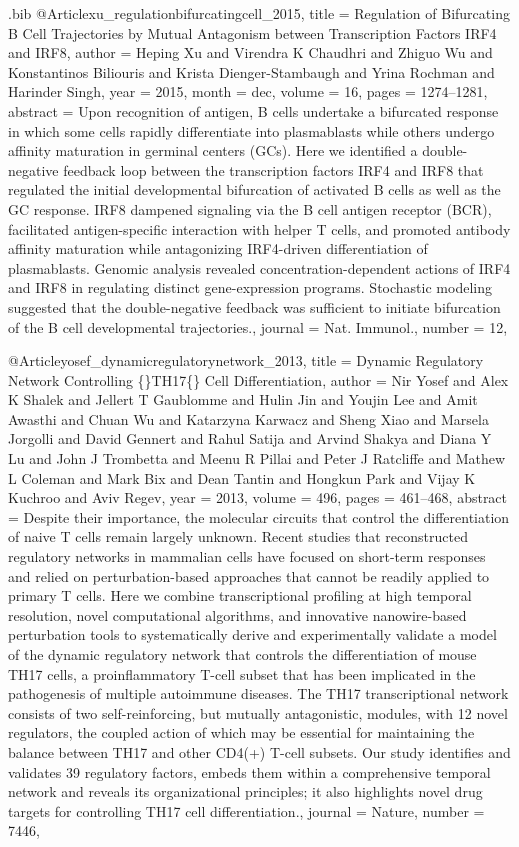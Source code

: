 \documentclass[
  table,
  10pt,
  a4paper]{article}
\begin{document}
\begin{filecontents}{\jobname.bib}
@Article{xu_regulationbifurcatingcell_2015,
	title = {Regulation of Bifurcating {{B}} Cell Trajectories by Mutual Antagonism between Transcription Factors {{IRF4}} and {{IRF8}}},
	author = {Heping Xu and Virendra K Chaudhri and Zhiguo Wu and Konstantinos Biliouris and Krista Dienger-Stambaugh and Yrina Rochman and Harinder Singh},
	year = {2015},
	month = {dec},
	volume = {16},
	pages = {1274--1281},
	abstract = {Upon recognition of antigen, B cells undertake a bifurcated response in which some cells rapidly differentiate into plasmablasts while others undergo affinity maturation in germinal centers (GCs). Here we identified a double-negative feedback loop between the transcription factors IRF4 and IRF8 that regulated the initial developmental bifurcation of activated B cells as well as the GC response. IRF8 dampened signaling via the B cell antigen receptor (BCR), facilitated antigen-specific interaction with helper T cells, and promoted antibody affinity maturation while antagonizing IRF4-driven differentiation of plasmablasts. Genomic analysis revealed concentration-dependent actions of IRF4 and IRF8 in regulating distinct gene-expression programs. Stochastic modeling suggested that the double-negative feedback was sufficient to initiate bifurcation of the B cell developmental trajectories.},
	journal = {Nat. Immunol.},
	number = {12},
}

@Article{yosef_dynamicregulatorynetwork_2013,
	title = {Dynamic Regulatory Network Controlling \{\vphantom\}{{TH17}}\vphantom\{\} Cell Differentiation},
	author = {Nir Yosef and Alex K Shalek and Jellert T Gaublomme and Hulin Jin and Youjin Lee and Amit Awasthi and Chuan Wu and Katarzyna Karwacz and Sheng Xiao and Marsela Jorgolli and David Gennert and Rahul Satija and Arvind Shakya and Diana Y Lu and John J Trombetta and Meenu R Pillai and Peter J Ratcliffe and Mathew L Coleman and Mark Bix and Dean Tantin and Hongkun Park and Vijay K Kuchroo and Aviv Regev},
	year = {2013},
	volume = {496},
	pages = {461--468},
	abstract = {Despite their importance, the molecular circuits that control the differentiation of naive T cells remain largely unknown. Recent studies that reconstructed regulatory networks in mammalian cells have focused on short-term responses and relied on perturbation-based approaches that cannot be readily applied to primary T cells. Here we combine transcriptional profiling at high temporal resolution, novel computational algorithms, and innovative nanowire-based perturbation tools to systematically derive and experimentally validate a model of the dynamic regulatory network that controls the differentiation of mouse TH17 cells, a proinflammatory T-cell subset that has been implicated in the pathogenesis of multiple autoimmune diseases. The TH17 transcriptional network consists of two self-reinforcing, but mutually antagonistic, modules, with 12 novel regulators, the coupled action of which may be essential for maintaining the balance between TH17 and other CD4(+) T-cell subsets. Our study identifies and validates 39 regulatory factors, embeds them within a comprehensive temporal network and reveals its organizational principles; it also highlights novel drug targets for controlling TH17 cell differentiation.},
	journal = {Nature},
	number = {7446},
}


\end{filecontents}
\end{document}
